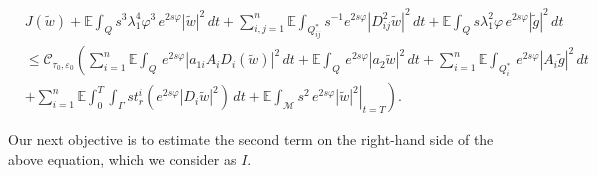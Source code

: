 \documentclass[11pt,oneside,leqno]{amsart}
\numberwithin{equation}{section}
\numberwithin{equation}{section}
\newcommand{\E}{\mathbb{E}}
\begin{document}
\begin{equation}\label{eq:inequalityEC}
\begin{split}
&J(\tilde{w}) + \E\int_{Q}s^{3}\lambda^{4}_{1}\varphi^{3}\,e^{2s\varphi}|\tilde{w}|^{2}\,dt + \sum_{i,j=1}^{n}\E\int_{Q_{ij}^\ast}s^{-1}e^{2s\varphi}|D_{ij}^2\tilde{w}|^2\, dt + \E\int_{Q}s\lambda_{1}^2\varphi\,e^{2s\varphi}|\tilde{g}|^2\,dt \\
&\leq \mathcal{C}_{\tau_0,\varepsilon_0}\left(\sum_{i=1}^{n}\E\int_{Q}\,e^{2s\varphi}|a_{1i}A_iD_i(\tilde{w})|^2\,dt + \E\int_{Q}\,e^{2s\varphi}|a_2\tilde{w}|^2\,dt + \sum_{i=1}^{n}\E\int_{Q_i^{\ast}}\,e^{2s\varphi}|A_i\tilde{g}|^2\,dt \right. \\
&\left. + \sum_{i=1}^{n}\E\int_0^T\int_{\Gamma}st_{r}^{i}(e^{2s\varphi}|D_i\tilde{w}|^2)\,dt + \left.\E\int_{\mathcal{M}}s^2\,e^{2s\varphi}|\tilde{w}|^2\right|_{t=T}\right).
\end{split}
\end{equation}

Our next objective is to estimate the second term on the right-hand side of the above equation, which we consider as $I$. 
\end{document}
